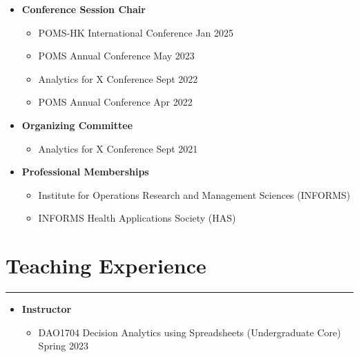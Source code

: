 \documentclass[12pt, a4paper]{article}
\begin{document}
{\begin{itemize}[leftmargin=16pt]
	\item[] \textbf{Conference Session Chair}
	\begin{itemize}[parsep=2pt, label=$\bullet$]
		\item POMS-HK International Conference \hfill Jan 2025
		\item POMS Annual Conference \hfill May 2023
		\item Analytics for X Conference \hfill Sept 2022
		\item POMS Annual Conference \hfill Apr 2022
	\end{itemize}

	\item[] \textbf{Organizing Committee}
	\begin{itemize}[parsep=2pt, label=$\bullet$]
		\item Analytics for X Conference \hfill Sept 2021
	\end{itemize}

	\item[] \textbf{Professional Memberships}
	\begin{itemize}[parsep=2pt, label=$\bullet$]
		\item Institute for Operations Research and Management Sciences (INFORMS)
		\item INFORMS Health Applications Society (HAS)
	\end{itemize}

\end{itemize}




\section*{Teaching Experience}
\vspace*{4pt}
\hrule

\begin{itemize}[leftmargin=16pt]
	\item[] \textbf{Instructor}
	\begin{itemize}[label=$\bullet$]
		\item DAO1704 Decision Analytics using Spreadsheets (Undergraduate Core) \hfill Spring 2023
	\end{itemize}


\end{itemize}}
\end{document}
